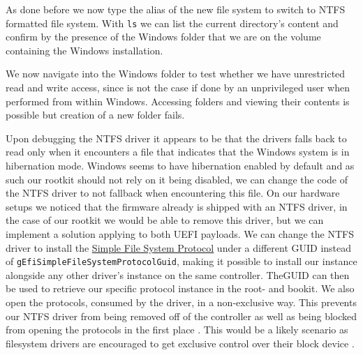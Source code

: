 As done before we now type the alias of the new file system to switch to NTFS formatted file system.
With \lstinline{ls} we can list the current directory's content and confirm by the presence of the Windows folder that we are on the volume containing the Windows installation.


We now navigate into the Windows folder to test whether we have unrestricted read and write access, since is not the case if done by an unprivileged user when performed from within Windows.
Accessing folders and viewing their contents is possible but creation of a new folder fails.

Upon debugging the \ac{NTFS} driver it appears to be that the drivers falls back to read only when it encounters a file that indicates that the Windows system is in hibernation mode.
Windows seems to have hibernation enabled by default and as such our rootkit should not rely on it being disabled, we can change the code of the \ac{NTFS} driver to not fallback when encountering this file. 
On our hardware setups we noticed that the firmware already is shipped with an \ac{NTFS} driver, in the case of our rootkit we would be able to remove this driver, but we can implement a solution applying to both \ac{UEFI} payloads. We can change the \ac{NTFS} driver to install the \hyperref[lst:simple-file-system-protocol]{Simple File System Protocol} under a different \ac{GUID} instead of \lstinline{gEfiSimpleFileSystemProtocolGuid}, making it possible to install our instance alongside any other driver's instance on the same controller. The\ac{GUID} can then be used to retrieve our specific protocol instance in the root- and bookit. We also open the protocols, consumed by the driver, in a non-exclusive way. This prevents our \ac{NTFS} driver from being removed off of the controller as well as being blocked from opening the protocols in the first place \cite[Section 7.3]{uefi-spec}. This would be a likely scenario as filesystem drivers are encouraged to get exclusive control over their block device \cite[Section 13.5]{uefi-spec}.

